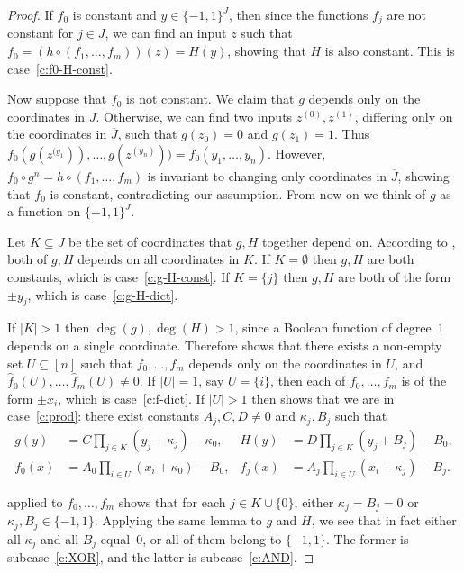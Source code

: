 \documentclass{article}
\theoremstyle{definition}
\theoremstyle{remark}
\begin{document}
\begin{proof}
If $f_0$ is constant and $y \in \{-1,1\}^J$, then since the functions $f_j$ are not constant for $j \in J$, we can find an input $z$ such that $f_0 = (h \circ (f_1,\ldots,f_m))(z) = H(y)$, showing that $H$ is also constant. This is case~\eqref{c:f0-H-const}.

Now suppose that $f_0$ is not constant. We claim that $g$ depends only on the coordinates in $J$. Otherwise, we can find two inputs $z^{(0)},z^{(1)}$, differing only on the coordinates in $\overline{J}$, such that $g(z_0) = 0$ and $g(z_1) = 1$. Thus $f_0(g(z^{(y_1})),\ldots,g(z^{(y_n)})) = f_0(y_1,\ldots,y_n)$. However, $f_0 \circ g^n = h \circ (f_1,\ldots,f_m)$ is invariant to changing only coordinates in $\overline{J}$, showing that $f_0$ is constant, contradicting our assumption.
From now on we think of $g$ as a function on $\{-1,1\}^J$.

Let $K \subseteq J$ be the set of coordinates that $g,H$ together depend on.
According to , both of $g,H$ depends on all coordinates in $K$.
If $K = \emptyset$ then $g,H$ are both constants, which is case~\eqref{c:g-H-const}.
If $K = \{j\}$ then $g,H$ are both of the form $\pm y_j$, which is case~\eqref{c:g-H-dict}.

If $|K| > 1$ then $\deg(g),\deg(H) > 1$, since a Boolean function of degree~$1$ depends on a single coordinate. Therefore  shows that there exists a non-empty set $U \subseteq [n]$ such that $f_0,\ldots,f_m$ depends only on the coordinates in $U$, and $\hat{f}_0(U),\ldots,\hat{f}_m(U) \neq 0$. If $|U|=1$, say $U = \{i\}$, then each of $f_0,\ldots,f_m$ is of the form $\pm x_i$, which is case~\eqref{c:f-dict}.
If $|U| > 1$ then  shows that we are in case~\eqref{c:prod}:
there exist constants $A_j,C,D \neq 0$ and $\kappa_j,B_j$ such that
\begin{align*}
g(y) &= C \prod_{j \in K} (y_j + \kappa_j) - \kappa_0,
&	
H(y) &= D \prod_{j \in K} (y_j + B_j) - B_0,
\\
f_0(x) &= A_0 \prod_{i \in U} (x_i + \kappa_0) - B_0,
&
f_j(x) &= A_j \prod_{i \in U} (x_i + \kappa_j) - B_j.
\end{align*}

 applied to $f_0,\ldots,f_m$ shows that for each $j \in K \cup \{0\}$, either $\kappa_j = B_j = 0$ or $\kappa_j,B_j \in \{-1,1\}$. Applying the same lemma to $g$ and $H$, we see that in fact either all $\kappa_j$ and all $B_j$ equal~$0$, or all of them belong to $\{-1,1\}$. The former is subcase~\eqref{c:XOR}, and the latter is subcase~\eqref{c:AND}.
\end{proof}
\end{document}
